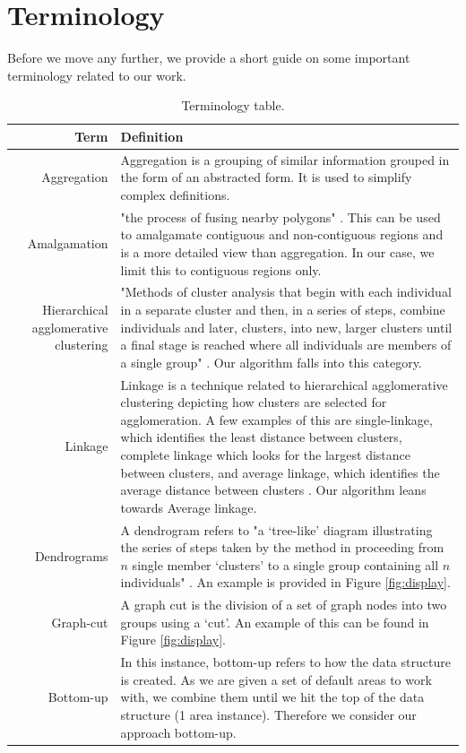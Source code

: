 \section{Terminology}
Before we move any further, we provide a short guide on some important terminology related to our work.
\begin{table}[h]
\footnotesize
\begin{tabularx}{\textwidth}{ r | X }
Term & Definition\\ \hline \hline
Aggregation &  Aggregation is a grouping of similar information grouped in the form of an abstracted form. It is used to simplify complex definitions. \cite{slocum2009thematic} \\
Amalgamation & "the process of fusing nearby polygons" \cite{slocum2009thematic}. This can be used to amalgamate contiguous and non-contiguous regions and is a more detailed view than aggregation. In our case, we limit this to contiguous regions only. \\
Hierarchical agglomerative clustering & "Methods of cluster analysis that begin with each individual in a separate cluster and then, in a series of steps, combine individuals and later, clusters, into new, larger clusters until a final stage is reached where all individuals are members of a single group" \cite{everitt2006cambridge}. Our algorithm falls into this category.\\
Linkage & Linkage is a technique related to hierarchical agglomerative clustering depicting how clusters are selected for agglomeration. A few examples of this are single-linkage, which identifies the least distance between clusters, complete linkage which looks for the largest distance between clusters, and average linkage, which identifies the average distance between clusters \cite{everitt_2011}. Our algorithm leans towards Average linkage. \\
Dendrograms & A dendrogram refers to "a ‘tree-like’ diagram illustrating the series of steps taken by the method in proceeding from $n$ single member ‘clusters’ to a single group containing all $n$ individuals" \cite{everitt2006cambridge}. An example is provided in Figure \ref{fig:display}. \\
Graph-cut & A graph cut is the division of a set of graph nodes into two groups using a `cut'. An example of this can be found in Figure \ref{fig:display}.\\
Bottom-up & In this instance, bottom-up refers to how the data structure is created. As we are given a set of default areas to work with, we combine them until we hit the top of the data structure (1 area instance). Therefore we consider our approach bottom-up. \\
\hline \hline
\end{tabularx}
\caption{Terminology table.}
\end{table}


